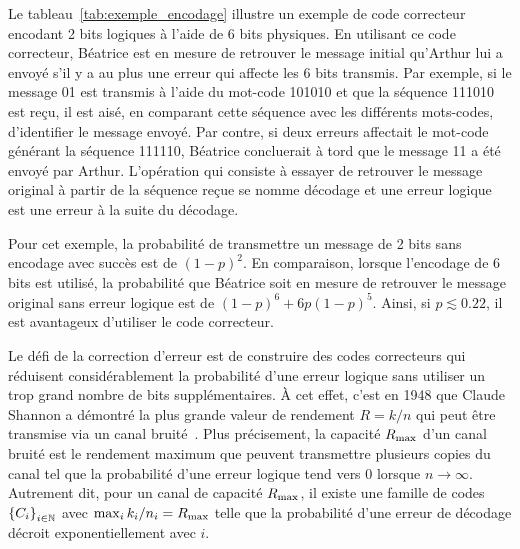Le tableau~\ref{tab:exemple_encodage} illustre un exemple de code correcteur
encodant 2 bits logiques à l'aide de 6 bits physiques.
En utilisant ce code correcteur,
Béatrice est en mesure de retrouver le message initial qu'Arthur lui a
envoyé s'il y a au plus une erreur qui affecte les 6 bits transmis. 
Par exemple, si le message 01 est transmis à l'aide du mot-code 
101010 et que la séquence 111010 est reçu, 
il est aisé, en comparant cette séquence avec les différents 
mots-codes, d'identifier le message envoyé. 
Par contre, 
si deux erreurs affectait le mot-code générant la séquence 111110, 
Béatrice concluerait à tord que le message 11 a été envoyé par Arthur.
L'opération qui consiste à essayer de retrouver le message original à partir
de la séquence reçue se nomme décodage 
et une erreur logique est une erreur à la suite du décodage.

Pour cet exemple,
la probabilité de transmettre un message de 2 bits sans encodage avec succès 
est de $(1 - p)^2$. 
En comparaison,
lorsque l'encodage de 6 bits est utilisé, 
la probabilité que Béatrice soit en mesure de retrouver le message original 
sans erreur logique est de $(1 - p)^6 + 6p(1 - p)^5$.
Ainsi, si $p \lesssim 0.22$, il est avantageux d'utiliser le code correcteur.

Le défi de la correction d'erreur est de construire des codes correcteurs 
qui réduisent considérablement la probabilité d'une erreur logique sans utiliser 
un trop grand nombre de bits supplémentaires.
À cet effet, c'est en 1948 que Claude Shannon a démontré la plus grande valeur 
de rendement $R = k/n$ qui peut être transmise 
via un canal bruité~\cite{shannon_mathematical_1948}.
Plus précisement,
la capacité $R_{\text{max}}$ d'un canal bruité est le rendement maximum 
que peuvent transmettre plusieurs copies du canal tel que la probabilité d'une 
erreur logique tend vers 0 lorsque $n \to \infty$.
Autrement dit,
pour un canal de capacité $R_{\text{max}}$, 
il existe une famille de codes $\qty{C_i}_{i\in\mathbb N}$ avec 
$\max_{i} k_i / n_i = R_{\text{max}}$ telle que la probabilité d'une erreur de 
décodage décroit exponentiellement avec $i$.

